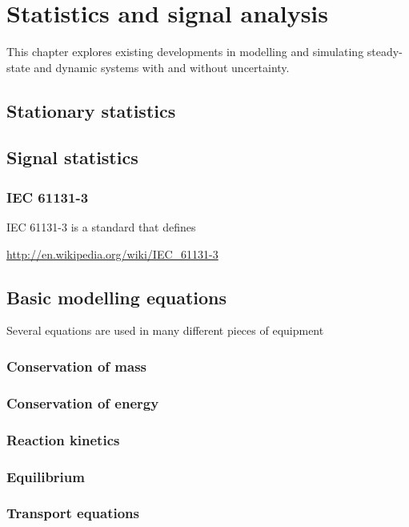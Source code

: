 \chapter{Statistics and signal analysis}\label{chap:stats}
\begin{overview} 
  This chapter explores existing developments in modelling and
  simulating steady-state and dynamic systems with and without
  uncertainty.
\end{overview}

\section{Stationary statistics}

\section{Signal statistics}

\subsection{IEC 61131-3}
IEC 61131-3 is a standard that defines

\url{http://en.wikipedia.org/wiki/IEC_61131-3}

\section{Basic modelling equations}
Several equations are used in many different pieces of equipment
\subsection{Conservation of mass}
\subsection{Conservation of energy}
\subsection{Reaction kinetics}



\subsection{Equilibrium}
\subsection{Transport equations}
